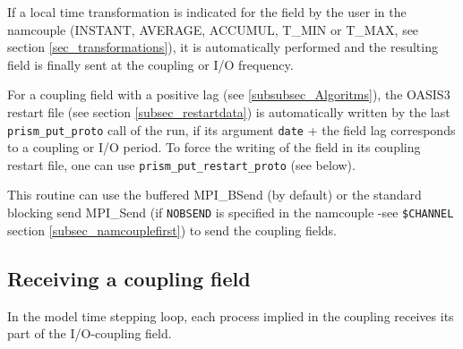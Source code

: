 If a local time transformation is indicated for the field by
the user in the namcouple (INSTANT, AVERAGE, ACCUMUL, T\_MIN or T\_MAX,
see section \ref{sec_transformations}), it is automatically performed
and the resulting field is finally sent at the coupling or I/O
frequency.

For a coupling field with a positive lag (see
\ref{subsubsec_Algoritms}), the OASIS3 restart file (see section
\ref{subsec_restartdata}) is automatically written by the
last {\tt prism\_put\_proto} call of the run, if its argument {\tt date}
+ the field lag corresponds to a coupling or I/O period. To
force the writing of the field in its coupling restart file, one can
use {\tt prism\_put\_restart\_proto} (see below).

This routine can use the buffered MPI\_BSend (by default) or the
standard blocking send MPI\_Send (if {\tt NOBSEND} is specified in the
namcouple -see {\tt \$CHANNEL} section
\ref{subsec_namcouplefirst}) to send the coupling fields.

\vspace*{0.5cm}

\subsection{Receiving a coupling field}

\vspace*{0.5cm}

In the model time stepping loop, each process implied in the coupling
receives its part of the I/O-coupling field. 

